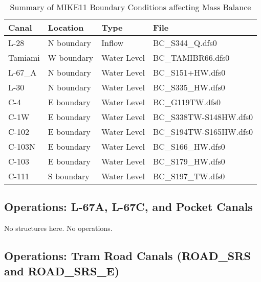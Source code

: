 \scriptsize
\begin{table}[!h]
\centering
\caption{Summary of MIKE11 Boundary Conditions affecting Mass Balance}
\label{tab:M11BCfiles}
\begin{tabular}{llll}
\hline
\textbf{Canal}  & \textbf{Location} & \textbf{Type}   & \textbf{File}     \\
\hline
L-28            & N boundary  & Inflow          & BC\_S344\_Q.dfs0 \\
Tamiami            & W boundary  & Water Level     & BC\_TAMIBR66.dfs0 \\
L-67\_A         & N boundary  & Water Level     & BC\_S151+HW.dfs0 \\
L-30            & N boundary  & Water Level     & BC\_S335\_HW.dfs0 \\
C-4             & E boundary  & Water Level     & BC\_G119TW.dfs0 \\
C-1W            & E boundary  & Water Level     & BC\_S338TW-S148HW.dfs0 \\
C-102           & E boundary  & Water Level     & BC\_S194TW-S165HW.dfs0 \\
C-103N          & E boundary  & Water Level     & BC\_S166\_HW.dfs0 \\
C-103           & E boundary  & Water Level     & BC\_S179\_HW.dfs0 \\
C-111           & S boundary  & Water Level     & BC\_S197\_TW.dfs0 \\
\hline
\end{tabular}
\end{table}
\normalsize


\subsection{Operations: L-67A, L-67C, and Pocket Canals}

No structures here. No operations.


\subsection{Operations: Tram Road Canals (ROAD\_SRS and ROAD\_SRS\_E)}

